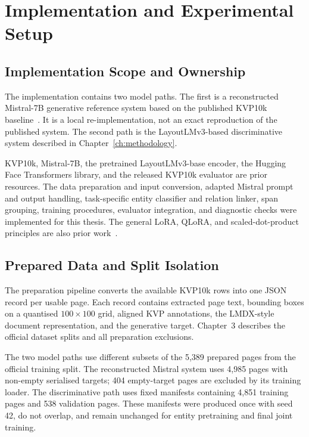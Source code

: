 \chapter{Implementation and Experimental Setup}
\label{ch:implementation}

\section{Implementation Scope and Ownership}
\label{sec:system-architecture}

The implementation contains two model paths. The first is a reconstructed
Mistral-7B generative reference system based on the published KVP10k
baseline~\cite{kvp10k,mistral}. It is a local re-implementation, not an exact
reproduction of the published system. The second path is the
LayoutLMv3-based discriminative system described in
Chapter~\ref{ch:methodology}.

KVP10k, Mistral-7B, the pretrained LayoutLMv3-base encoder, the Hugging Face
Transformers library, and the released KVP10k evaluator are prior resources.
The data preparation and input conversion, adapted Mistral prompt and output
handling, task-specific entity classifier and relation linker, span grouping,
training procedures, evaluator integration, and diagnostic checks were
implemented for this thesis. The general LoRA, QLoRA, and scaled-dot-product
principles are also prior work~\cite{lora,qlora,vaswani2017attention}.

\section{Prepared Data and Split Isolation}
\label{sec:data-preprocessing}

The preparation pipeline converts the available KVP10k rows into one JSON
record per usable page. Each record contains extracted page text, bounding
boxes on a quantised $100\times100$ grid, aligned KVP annotations, the
LMDX-style document representation, and the generative target. Chapter~3
describes the official dataset splits and all preparation exclusions.

The two model paths use different subsets of the 5{,}389 prepared pages from
the official training split. The reconstructed Mistral system uses 4{,}985
pages with non-empty serialised targets; 404 empty-target pages are excluded
by its training loader. The discriminative path uses fixed manifests containing
4{,}851 training pages and 538 validation pages. These manifests were produced
once with seed 42, do not overlap, and remain unchanged for entity pretraining
and final joint training.

